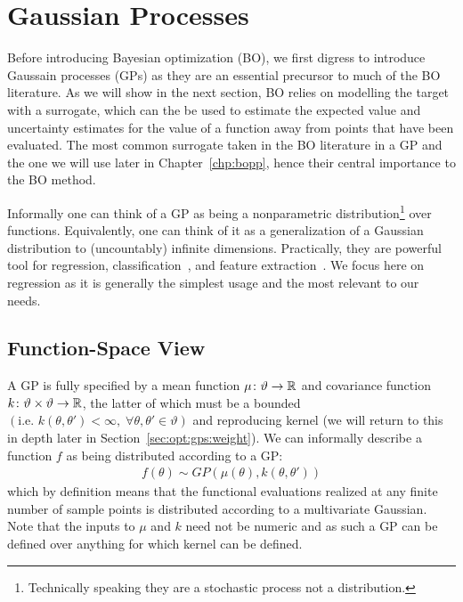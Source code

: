 
\section{Gaussian Processes}
\label{sec:opt:GPs}

Before introducing Bayesian optimization (BO), we first digress to introduce Gaussain
processes (GPs) as they are an essential precursor to much of the BO literature.  
As we will show in the next section, BO relies on modelling the target with a surrogate,
which can the be used to estimate the expected value and uncertainty estimates for 
the value of a function away from points that have been evaluated.  The most common
surrogate taken in the BO literature in a GP and the one we will use later in Chapter~\ref{chp:bopp}, 
hence their central importance to the BO method.

Informally one can think of a GP \citep{rasmussen2006gaussian} as being a nonparametric 
distribution\footnote{Technically speaking they are a stochastic process not a distribution.} over functions.
Equivalently, one can think of it as a generalization of a Gaussian distribution
to (uncountably) infinite dimensions.  Practically, they are powerful tool for regression, classification~\cite{kuss2005assessing}, 
and feature extraction~\cite{lawrence2004gaussian}.  We focus here on regression as it is generally
the simplest usage and the most relevant to our needs.

\subsection{Function-Space View}
\label{sec:opt:GPs:function}

A GP is fully specified by a mean function $\mu \colon \vartheta \rightarrow \mathbb{R}$ and covariance function 
$k \colon \vartheta \times \vartheta \rightarrow \mathbb{R}$, the latter of which must be a bounded 
$\left(\text{i.e. }k\left(\theta,\theta'\right)<\infty, \; \forall \theta,\theta' \in \vartheta\right)$ 
and reproducing kernel (we will return to this in depth later in Section~\ref{sec:opt:gps:weight}).  
We can informally describe a function $f$ as being distributed 
according to a GP:
\begin{align}
\label{eq:GP}
f \left(\theta\right) \sim GP \left(\mu\left(\theta\right), k\left(\theta,\theta'\right)\right)
\end{align}
which by definition means that the functional evaluations realized at any finite number of sample points is distributed according to a multivariate Gaussian. Note that the inputs to $\mu$ and $k$ need not be numeric and as such a GP can be defined over anything for which kernel can be defined.

